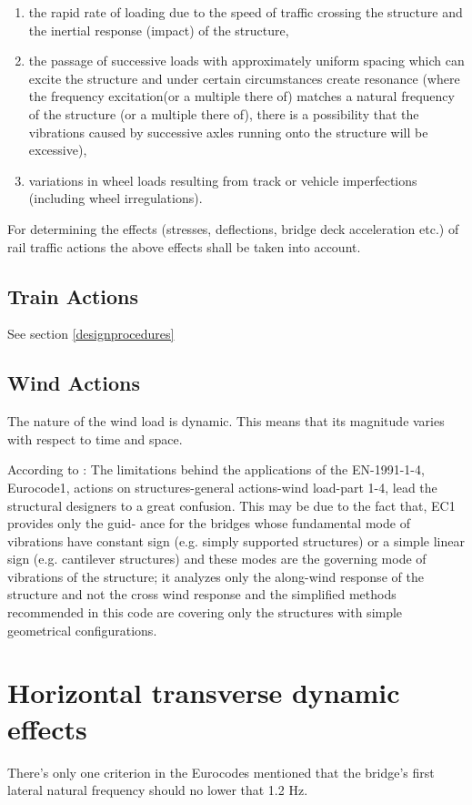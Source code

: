 \begin{enumerate}[-]
	\item the rapid rate of loading due to the speed of traffic crossing the structure and the inertial response (impact) of the structure,
	\item the passage of successive loads with approximately uniform spacing which can excite the structure and under certain circumstances create resonance (where the frequency excitation(or a multiple there of) matches a natural frequency of the structure (or a multiple there of), there is a possibility that the vibrations caused by successive axles running onto the structure will be excessive),
	\item variations in wheel loads resulting from track or vehicle imperfections (including wheel irregulations).
\end{enumerate}
For determining the effects (stresses, deflections, bridge deck acceleration etc.) of rail traffic actions the above effects shall be taken into account.


\subsection{Train Actions}
See section \ref{designprocedures}


\subsection{Wind Actions}
The nature of the wind load is dynamic. This means that its magnitude varies with respect to time and space.

According to \cite{mohammadi2013wind}: The limitations behind the applications of the EN-1991-1-4, Eurocode1, actions on structures-general actions-wind load-part 1-4, lead the structural designers to a great confusion. This may be due to the fact that, EC1 provides only the guid- ance for the bridges whose fundamental mode of vibrations have constant sign (e.g. simply supported structures) or a simple linear sign (e.g. cantilever structures) and these modes are the governing mode of vibrations of the structure; it analyzes only the along-wind response of the structure and not the cross wind response and the simplified methods recommended in this code are covering only the structures with simple geometrical configurations.

\section{Horizontal transverse dynamic effects}
There's only one criterion in the Eurocodes mentioned that the bridge's first lateral natural frequency should no lower that 1.2 Hz. 

